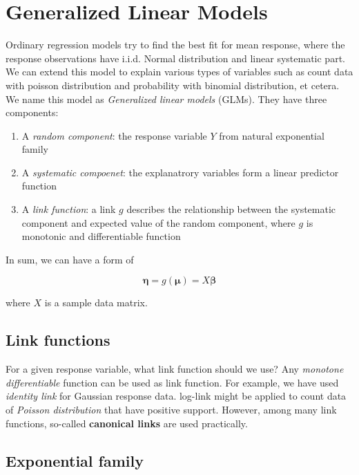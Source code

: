 \documentclass[]{book}
\providecommand{\tightlist}{%
  \setlength{\itemsep}{0pt}\setlength{\parskip}{0pt}}
\begin{document}
\hypertarget{generalized-linear-models}{%
\section{Generalized Linear Models}\label{generalized-linear-models}}

Ordinary regression models try to find the best fit for mean response, where the response observations have i.i.d. Normal distribution and linear systematic part. We can extend this model to explain various types of variables such as count data with poisson distribution and probability with binomial distribution, et cetera. We name this model as \emph{Generalized linear models} (GLMs). They have three components:

\begin{enumerate}
\def\labelenumi{\arabic{enumi}.}
\tightlist
\item
  A \emph{random component}: the response variable \(Y\) from natural exponential family
\item
  A \emph{systematic compoenet}: the explanatrory variables form a linear predictor function
\item
  A \emph{link function}: a link \(g\) describes the relationship between the systematic component and expected value of the random component, where \(g\) is monotonic and differentiable function
\end{enumerate}

In sum, we can have a form of

\[\boldsymbol{\eta} = g(\boldsymbol{\mu}) = X\boldsymbol{\beta}\]

where \(X\) is a sample data matrix.

\hypertarget{link-functions}{%
\subsection{Link functions}\label{link-functions}}

For a given response variable, what link function should we use? Any \emph{monotone differentiable} function can be used as link function. For example, we have used \emph{identity link} for Gaussian response data. log-link might be applied to count data of \emph{Poisson distribution} that have positive support. However, among many link functions, so-called \textbf{canonical links} are used practically.

\hypertarget{exponential-family}{%
\subsection{Exponential family}\label{exponential-family}}
\end{document}
